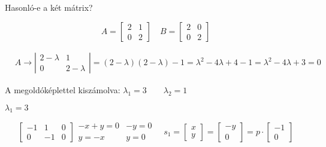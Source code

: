 \begin{comment}
\begin{center}
2022. február 24.

Gyakorlatvezető: Dr. Ács Bernadett

Témakör: Leképezések
\end{center}
\end{comment}

\subsection{}
Hasonló-e a két mátrix?

$$
A=\left[\begin{array}{ll}
2 & 1 \\
0 & 2
\end{array}\right] \quad B=\left[\begin{array}{ll}
2 & 0 \\
0 & 2
\end{array}\right]
$$

$$
\begin{aligned}
& A \rightarrow\left|\begin{array}{cc}2-\lambda & 1 \\0 & 2-\lambda\end{array}\right|=(2-\lambda)(2-\lambda)-1=\lambda^{2}-4 \lambda+4-1=\lambda^{2}-4 \lambda+3 = 0
\end{aligned}
$$

A megoldóképlettel kiszámolva:
$\lambda_1 = 3 \qquad \lambda_2 = 1$

\vspace{2mm}
$\lambda_{1}=3$

$$
\left[\begin{array}{rr|r}
-1 & 1 & 0 \\
0 & -1 & 0
\end{array}\right] \begin{array}{rr}
-x+y=0 & -y=0 \\
y=-x & y=0
\end{array} \quad s_{1}=\left[\begin{array}{l}
x \\
y
\end{array}\right]=\left[\begin{array}{c}
-y \\
0
\end{array}\right]=p \cdot\left[\begin{array}{c}
-1 \\
0
\end{array}\right]
$$

